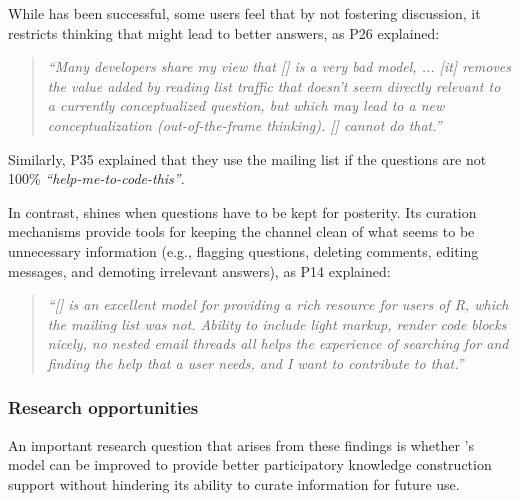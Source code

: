 While \SO has been successful, some users feel that by not fostering discussion, it restricts thinking that might lead to better answers, as P26 explained:
    \begin{quote}
        \textit{``Many developers share my view that [\SO] is a very bad model, ... [it] removes the value added by reading list traffic that doesn't seem directly relevant to a currently conceptualized question, but which may lead to a new conceptualization (out-of-the-frame thinking). [\SO] cannot do that.''}
    \end{quote}
    Similarly, P35 explained that they use the \RH mailing list if the questions are not 100\% \textit{``help-me-to-code-this''}.

    In contrast, \SO shines when questions have to be kept for posterity. 
    Its curation mechanisms provide tools for keeping the channel clean of what seems to be unnecessary information (e.g., flagging questions, deleting comments, editing messages, and demoting irrelevant answers), as P14 explained:

    \begin{quote}
        \textit{``[\SO] is an excellent model for providing a rich resource for users of R, which the \RH mailing list was not. 
        Ability to include light markup, render code blocks nicely, no nested email threads all helps the experience of searching for and finding the help that a user needs, and I want to contribute to that.''}
    \end{quote}


\subsubsection{Research opportunities}

An important research question that arises from these findings is whether \SO's model can be improved to provide better participatory knowledge construction support without hindering its ability to curate information for future use.

